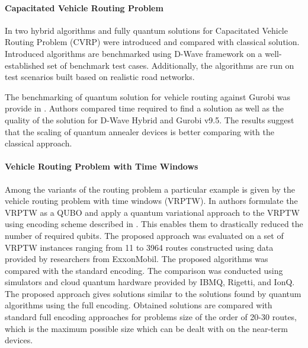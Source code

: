 \documentclass[a4paper,11pt]{article}
\begin{document}
\paragraph{Capacitated Vehicle Routing Problem} In \cite{borowski2020new} two hybrid algorithms and fully quantum solutions for Capacitated Vehicle Routing Problem (CVRP) were introduced and compared with classical solution. Introduced algorithms are benchmarked using D-Wave framework on a well-established set of benchmark test cases. Additionally, the algorithms are run on test scenarios built based on realistic road networks.

The benchmarking of quantum solution for vehicle routing against Gurobi was provide in \cite{anil2022performance}. Authors compared time required to find a solution as well as the quality of the solution for D-Wave Hybrid and  Gurobi v9.5. The results suggest that the scaling of quantum annealer devices is better comparing with the classical approach.


\paragraph{Vehicle Routing Problem with Time Windows}
Among the variants of the routing problem a particular example is given by the
vehicle routing problem with time windows (VRPTW). In \cite{leonidas2023qubit} authors formulate the VRPTW as a QUBO and apply a quantum variational approach to the VRPTW using encoding scheme described in \cite{vikstaal2020applying}. This enables them to drastically reduced the number of required qubits. The proposed approach was evaluated on a set of VRPTW instances ranging from 11 to 3964 routes constructed using data provided by researchers from ExxonMobil. The proposed algorithms was compared with the standard encoding. The comparison was conducted using simulators and cloud quantum hardware provided by IBMQ, Rigetti, and IonQ. The proposed approach gives solutions similar to the solutions found by quantum algorithms using the full encoding. Obtained solutions are compared with standard full encoding approaches for problems size  of the order of 20-30 routes, which is the maximum possible size which can be dealt with on the near-term devices.

\end{document}

